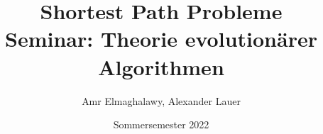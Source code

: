 \documentclass[11pt,a4paper]{article}
\title{Shortest Path Probleme\\[0.5em] \large{Seminar: Theorie evolutionärer Algorithmen \\[0.5em]} }
\author{Amr Elmaghalawy, Alexander Lauer}
\date{Sommersemester 2022}
\numberwithin{equation}{section}
\begin{document}
\maketitle
\begin{abstract}

\end{abstract}
\newpage
\tableofcontents
\newpage





\cite{neumann2013bioinspired}




\newpage



\end{document}

